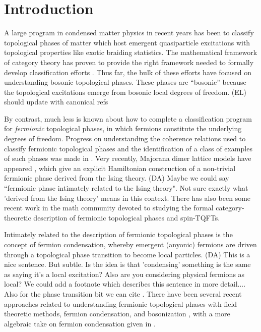 \documentclass[12pt,a4paper]{article}
\newcommand{\dave}[1]{{\color{ao(english)}\footnotesize{(DA) #1}}}
\newcommand{\ethan}[1]{{\color{amethyst}\footnotesize{(EL) #1}}}
\begin{document}
\section{Introduction}

A large program in condensed matter physics in recent years has been to classify 
topological phases of matter which host emergent quasiparticle excitations 
with topological properties like exotic braiding statistics. 
The mathematical framework of category theory has proven to provide the right 
framework needed to formally develop classification efforts \cite{kitaev2006}. 
Thus far, the bulk of these efforts have focused on understanding bosonic topological phases.
These phases are ``bosonic'' because the topological excitations emerge from bosonic 
local degrees of freedom. \ethan{should update with canonical refs}

By contrast, much less is known about how to complete a classification program for {\it fermionic} topological phases, in which fermions constitute 
the underlying degrees of freedom. 
Progress on understanding the coherence relations used to classify fermionic topological phases and the identification of a class of examples of such phases was made in \cite{gu2015,gu2014,Lan2016b}. 
Very recently, Majorana dimer lattice models have appeared \cite{ware2016,tarantino2016}, 
which give an explicit Hamiltonian construction of a 
non-trivial
fermionic phase derived from the Ising theory. \dave{Maybe we could say ``fermionic phase intimately related to the Ising theory". 
Not sure exactly what 'derived from the Ising theory' means in this context.}
There has also been some recent work in the math community \cite{usher2016,brundan2016,bruillard2017} 
devoted to studying the formal category-theoretic description of fermionic topological phases and spin-TQFTs. 

Intimately related to the description of fermionic topological phases is the concept of fermion condensation, 
whereby emergent (anyonic) fermions are driven through a topological phase transition to become 
local particles. 
\dave{This is a nice sentence. But subtle. 
Is the idea is that 'condensing' something is the same as saying it's a local excitation?
Also are you considering physical fermions as local?
We could add a footnote which describes this sentence in more detail....
Also for the phase transition bit we can cite \cite{Bais2009}.}
There have been several recent approaches related to understanding 
fermionic topological phases with field theoretic methods, fermion condensation, and bosonization \cite{gaiotto2016, bhardwaj2016, bhardwaj2016b,kapustin2017,putrov2016}, 
with a more algebraic take on fermion condensation given in \cite{wan2016}. 
\end{document}
